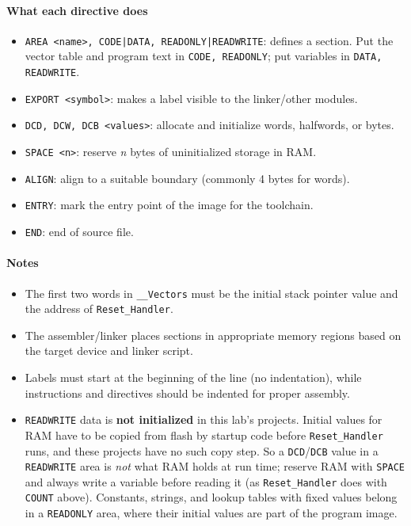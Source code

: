 \paragraph{What each directive does}
\begin{itemize}[nosep]
  \item \texttt{AREA <name>, CODE|DATA, READONLY|READWRITE}:
        defines a section. Put the vector table and program text in \texttt{CODE, READONLY};
        put variables in \texttt{DATA, READWRITE}.
  \item \texttt{EXPORT <symbol>}: makes a label visible to the linker/other modules.
  \item \texttt{DCD, DCW, DCB <values>}: allocate and initialize words, halfwords, or bytes.
  \item \texttt{SPACE <n>}: reserve \textit{n} bytes of uninitialized storage in RAM.
  \item \texttt{ALIGN}: align to a suitable boundary (commonly 4 bytes for words).
  \item \texttt{ENTRY}: mark the entry point of the image for the toolchain.
  \item \texttt{END}: end of source file.
\end{itemize}

\paragraph{Notes}
\begin{itemize}[nosep]
    \item The first two words in \texttt{\_\_Vectors} must be the initial stack pointer value and the address of \texttt{Reset\_Handler}.
    \item The assembler/linker places sections in appropriate memory regions based on the target device and linker script.
    \item Labels must start at the beginning of the line (no indentation), while instructions and directives should be indented for proper assembly.
    \item \texttt{READWRITE} data is \textbf{not initialized} in this lab's projects. Initial values for RAM have to be copied from flash by startup code before \texttt{Reset\_Handler} runs, and these projects have no such copy step. So a \texttt{DCD}/\texttt{DCB} value in a \texttt{READWRITE} area is \emph{not} what RAM holds at run time; reserve RAM with \texttt{SPACE} and always write a variable before reading it (as \texttt{Reset\_Handler} does with \texttt{COUNT} above). Constants, strings, and lookup tables with fixed values belong in a \texttt{READONLY} area, where their initial values are part of the program image.
\end{itemize}

